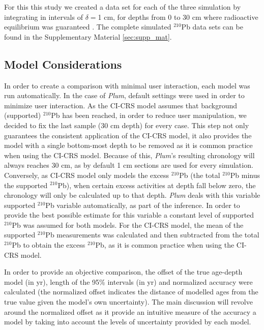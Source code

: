 \documentclass [10pt] {article}
\begin{document}
For this this study we created a data set for each of the three simulation by integrating in intervals of $\delta =$1 cm, for depths from  0 to 30 cm where radioactive equilibrium was guaranteed \citep{Aquino2018}.
The complete simulated $^{210}$Pb data sets can be found in the Supplementary Material \ref{sec:supp_mat}.

\subsection{Model Considerations}
In order to create a comparison with minimal user interaction, each model was run automatically.
In the case of \textit{Plum}, default settings were used in order to minimize user interaction.
As the CI-CRS model assumes that background (supported) $^{210}$Pb has been reached, in order to reduce user manipulation, we decided to fix the last sample (30 cm depth) for every case.
This step not only guarantees the consistent application of the CI-CRS model, it also provides the model with a single bottom-most depth to be removed as it is common practice when using the CI-CRS model.
Because of this, \textit{Plum}'s resulting chronology will always reaches 30 cm, as by default 1 cm sections are used for every simulation.
Conversely, as CI-CRS model only models the excess $^{210}$Pb (the total $^{210}$Pb minus the supported $^{210}$Pb), when certain excess activities at depth fall below zero, the chronology will only be calculated up to that depth.
\textit{Plum} deals with this variable supported $^{210}$Pb variable automatically, as part of the inference.
In order to provide the best possible estimate for this variable a constant level of supported $^{210}$Pb was assumed for both models.
For the CI-CRS model, the mean of the supported $^{210}$Pb measurements was calculated and then subtracted from the total $^{210}$Pb to obtain the excess $^{210}$Pb, as it is common practice when using the CI-CRS model.

In order to provide an objective comparison, the offset of the true age-depth model (in yr), length of the 95\% intervals (in yr) and normalized accuracy were calculated (the normalized offset indicates the distance of modelled ages from the true value given the model's own uncertainty). 
The main discussion will revolve around the normalized offset as it provide an intuitive measure of the accuracy a model by taking into account the levels of uncertainty provided by each model. 

\end{document}
